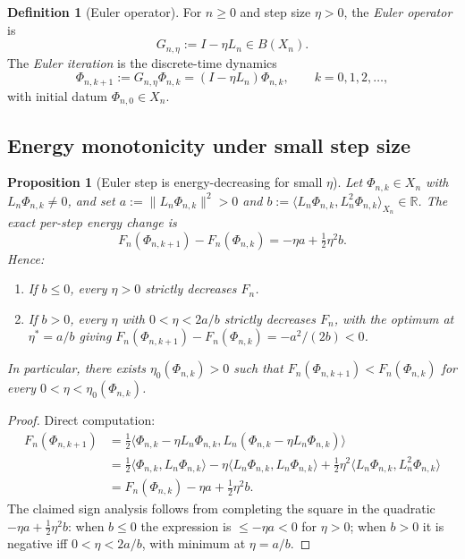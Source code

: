 \documentclass[11pt, a4paper]{amsart}
\newtheorem{proposition}[theorem]{Proposition}
\theoremstyle{definition}
\newtheorem{definition}[theorem]{Definition}
\newcommand{\R}{\mathbb{R}}
\begin{document}
\begin{definition}[Euler operator]
\label{def:Euler}
For $n \geq 0$ and step size $\eta > 0$, the \emph{Euler operator}
is
\[
  G_{n, \eta} := I - \eta L_n \in B(X_n).
\]
The \emph{Euler iteration} is the discrete-time dynamics
\[
  \Phi_{n, k+1} := G_{n, \eta} \Phi_{n, k} = (I - \eta L_n)
    \Phi_{n, k}, \qquad k = 0, 1, 2, \ldots,
\]
with initial datum $\Phi_{n, 0} \in X_n$.
\end{definition}

\subsection{Energy monotonicity under small step size}

\begin{proposition}[Euler step is energy-decreasing for small $\eta$]
\label{prop:euler-energy-decrease}
Let $\Phi_{n, k} \in X_n$ with $L_n \Phi_{n, k} \neq 0$, and set
$a := \|L_n \Phi_{n, k}\|^2 > 0$ and $b := \langle L_n \Phi_{n, k},
L_n^2 \Phi_{n, k} \rangle_{X_n} \in \R$. The exact per-step
energy change is
\[
  F_n(\Phi_{n, k+1}) - F_n(\Phi_{n, k}) = -\eta a + \tfrac{1}{2}
    \eta^2 b.
\]
Hence:
\begin{enumerate}
\item If $b \leq 0$, every $\eta > 0$ strictly decreases $F_n$.
\item If $b > 0$, every $\eta$ with $0 < \eta < 2a/b$ strictly
  decreases $F_n$, with the optimum at $\eta^* = a/b$ giving
  $F_n(\Phi_{n, k+1}) - F_n(\Phi_{n, k}) = -a^2/(2b) < 0$.
\end{enumerate}
In particular, there exists $\eta_0(\Phi_{n, k}) > 0$ such that
$F_n(\Phi_{n, k+1}) < F_n(\Phi_{n, k})$ for every $0 < \eta <
\eta_0(\Phi_{n, k})$.
\end{proposition}

\begin{proof}
Direct computation:
\begin{align*}
  F_n(\Phi_{n, k+1})
  &= \tfrac{1}{2} \langle \Phi_{n, k} - \eta L_n \Phi_{n, k},
    L_n (\Phi_{n, k} - \eta L_n \Phi_{n, k}) \rangle \\
  &= \tfrac{1}{2} \langle \Phi_{n, k}, L_n \Phi_{n, k} \rangle
    - \eta \langle L_n \Phi_{n, k}, L_n \Phi_{n, k} \rangle
    + \tfrac{1}{2}\eta^2 \langle L_n \Phi_{n, k}, L_n^2 \Phi_{n, k}
      \rangle \\
  &= F_n(\Phi_{n, k}) - \eta a + \tfrac{1}{2}\eta^2 b.
\end{align*}
The claimed sign analysis follows from completing the square in the
quadratic $-\eta a + \tfrac{1}{2}\eta^2 b$: when $b \leq 0$ the
expression is $\leq -\eta a < 0$ for $\eta > 0$; when $b > 0$ it is
negative iff $0 < \eta < 2a/b$, with minimum at $\eta = a/b$.
\end{proof}
\end{document}
